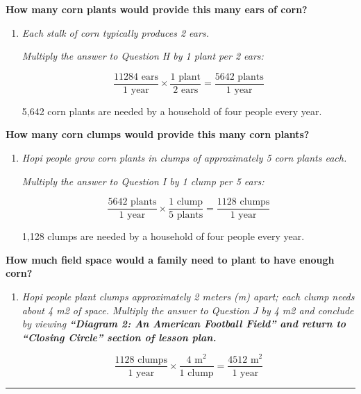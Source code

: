 \documentclass[12pt,]{article}
\begin{document}
\textbf{How many {corn plants} would provide this many ears of corn?}

\begin{enumerate}
\def\labelenumi{\Roman{enumi}.}
\item
  \emph{Each stalk of corn typically produces 2 ears.}

  \emph{Multiply the answer to Question H by 1 plant per 2 ears:}

  \[\frac{11284\text{ ears}}{1\text{ year}}\times\frac{1\text{ plant}}{2\text{ ears}}=\frac{5642\text{ plants}}{1 \text{ year}}\]

  5,642 corn plants are needed by a household of four people every year.
\end{enumerate}

\textbf{How many {corn clumps} would provide this many corn plants?}

\begin{enumerate}
\def\labelenumi{\Alph{enumi}.}
\setcounter{enumi}{9}
\item
  \emph{Hopi people grow corn plants in clumps of approximately 5 corn plants each.}

  \emph{Multiply the answer to Question I by 1 clump per 5 ears:}

  \[\frac{5642\text{ plants}}{1\text{ year}}\times\frac{1\text{ clump}}{5\text{ plants}}=\frac{1128\text{ clumps}}{1 \text{ year}}\]

  1,128 clumps are needed by a household of four people every year.
\end{enumerate}

\textbf{How much {field space} would a family need to plant to have enough corn? }

\begin{enumerate}
\def\labelenumi{\Alph{enumi}.}
\setcounter{enumi}{10}
\item
  \emph{Hopi people plant clumps approximately 2 meters (m) apart; each clump needs about 4 m2 of space. Multiply the answer to Question J by 4 m2 and conclude by viewing \textbf{{``Diagram 2: An American Football Field''} and return to ``Closing Circle'' section of lesson plan.}}

  \[\frac{1128\text{ clumps}}{1\text{ year}}\times\frac{4\text{ m}^2}{1\text{ clump}}=\frac{4512\text{ m}^2}{1 \text{ year}}\]
\end{enumerate}

\begin{center}\rule{0.5\linewidth}{\linethickness}\end{center}
\end{document}
